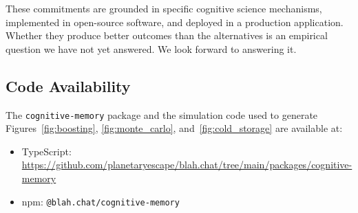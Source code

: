\documentclass[11pt,a4paper]{article}
\begin{document}
These commitments are grounded in specific cognitive science mechanisms, implemented in open-source software, and deployed in a production application. Whether they produce better outcomes than the alternatives is an empirical question we have not yet answered. We look forward to answering it.

\subsection*{Code Availability}

The \texttt{cognitive-memory} package and the simulation code used to generate Figures~\ref{fig:boosting}, \ref{fig:monte_carlo}, and~\ref{fig:cold_storage} are available at:

\begin{itemize}
    \item TypeScript: \url{https://github.com/planetaryescape/blah.chat/tree/main/packages/cognitive-memory}
    \item npm: \texttt{@blah.chat/cognitive-memory}
\end{itemize}



\end{document}
